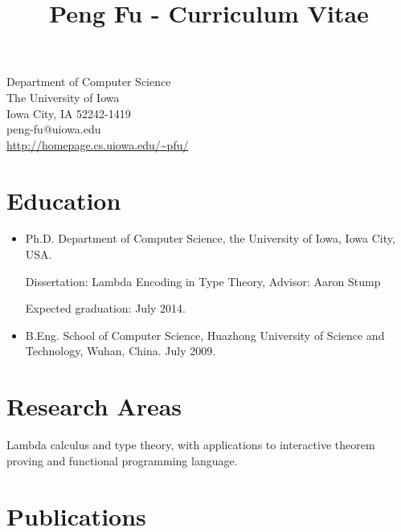 \documentclass[10pt]{article}
\title{\bfseries\Large Peng Fu - Curriculum Vitae}
\date{}
\begin{document}
\maketitle
\vspace{-4em}
\begin{center}
\begin{minipage}[c]{0.48\textwidth}
Department of Computer Science\\
The University of Iowa\\
Iowa City, IA 52242-1419\\
peng-fu@uiowa.edu\\
\url{http://homepage.cs.uiowa.edu/~pfu/}
\end{minipage}
\end{center}
\vspace{20pt}

\section*{Education}

\begin{itemize}
\item   Ph.D. Department of Computer Science, the University of Iowa, Iowa City, USA. 

  Dissertation: Lambda Encoding in Type Theory, Advisor: Aaron Stump
  
  Expected graduation: July 2014.
  \item B.Eng. School of Computer Science, Huazhong University of Science and Technology, Wuhan, China. July 2009.
\end{itemize}


\section*{Research Areas}
Lambda calculus and type theory, with applications to interactive theorem proving and functional programming language. 

\section*{Publications}
\end{document}
